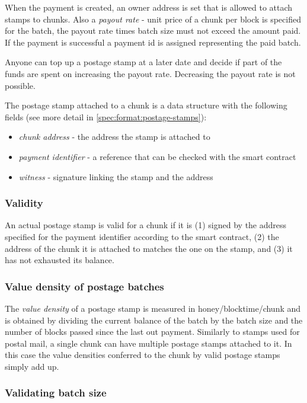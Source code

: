 When the payment is created, an owner address is set that is allowed to attach stamps to chunks. Also a \emph{payout rate} - unit price of a chunk per block is specified for the batch, the payout rate times batch size must not exceed the amount paid. If the payment is successful a payment id is assigned representing the paid batch. 

Anyone can top up a postage stamp at a later date and decide if part of the funds are spent on increasing the payout rate. Decreasing the payout rate is not possible. 

The postage stamp attached to a chunk is a data structure with the following fields (see more detail in \ref{spec:format:postage-stamps}):

\begin{itemize}
    \item \emph{chunk address} - the address the stamp is attached to 
    \item \emph{payment identifier} - a reference that can be checked with the smart contract
    \item \emph{witness} - signature linking the stamp and the address 
\end{itemize}

\subsubsection{Validity}

An actual postage stamp is valid for a chunk if it is (1) signed by the address specified for the payment identifier according to the smart contract, (2) the address of the chunk it is attached to matches the one on the stamp, and (3) it has not exhausted its balance.

\subsubsection{Value density of postage batches}

The \emph{value density} of a postage stamp is measured in honey/blocktime/chunk and is obtained by dividing the current balance of the batch by the batch size and the number of blocks passed since the last out payment. Similarly to stamps used for postal mail, a single chunk can have multiple postage stamps attached to it. In this case the value densities conferred to the chunk by valid postage stamps simply add up. 

\subsubsection{Validating batch size}

